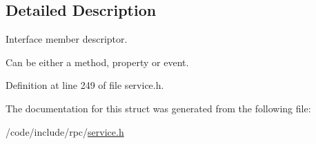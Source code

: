 \subsection{Detailed Description}
Interface member descriptor.

Can be either a method, property or event. 

Definition at line 249 of file service.\+h.



The documentation for this struct was generated from the following file\+:\begin{DoxyCompactItemize}
\item 
/code/include/rpc/\hyperlink{service_8h}{service.\+h}\end{DoxyCompactItemize}
